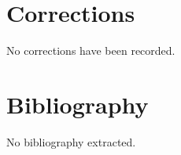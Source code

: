 \documentclass[11pt]{article}
\begin{document}
\section*{Corrections}
No corrections have been recorded.

\section*{Bibliography}
No bibliography extracted.

% 
% 
\end{document}
